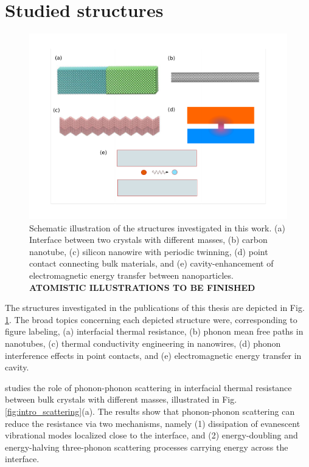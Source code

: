 \section{Studied structures}

\begin{figure}
\begin{center}
 \includegraphics[width=.99\columnwidth]{inkscape/systems.pdf}
 \caption{Schematic illustration of the structures investigated in this work. (a) Interface between two crystals with different masses, (b) carbon nanotube, (c) silicon nanowire with periodic twinning, (d) point contact connecting bulk materials, and (e) cavity-enhancement of electromagnetic energy transfer between nanoparticles. \textbf{ATOMISTIC ILLUSTRATIONS TO BE FINISHED}}
\label{fig:intro_structures}
\end{center}
\end{figure}

The structures investigated in the publications of this thesis are depicted in Fig. \ref{fig:intro_structures}. The broad topics concerning each depicted structure were, corresponding to figure labeling, (a) interfacial thermal resistance, (b) phonon mean free paths in nanotubes, (c) thermal conductivity engineering in nanowires, (d) phonon interference effects in point contacts, and (e) electromagnetic energy transfer in cavity. %

 studies the role of phonon-phonon scattering in interfacial thermal resistance between bulk crystals with different masses, illustrated in Fig. \ref{fig:intro_scattering}(a). The results show that phonon-phonon scattering can reduce the resistance via two mechanisms, namely (1) dissipation of evanescent vibrational modes localized close to the interface, and (2) energy-doubling and energy-halving three-phonon scattering processes carrying energy across the interface.  %


